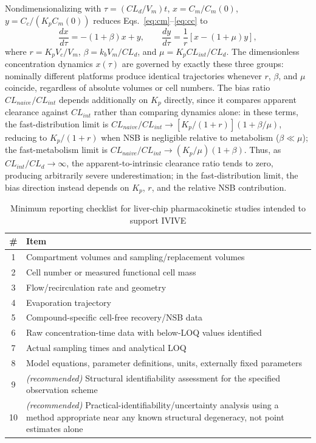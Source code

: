 Nondimensionalizing with $\tau = (CL_d/V_m)t$, $x = C_m/C_m(0)$, $y = C_c/(K_p C_m(0))$ reduces Eqs.~\eqref{eq:cm}--\eqref{eq:cc} to
\begin{equation}
\frac{dx}{d\tau} = -(1+\beta)x + y, \qquad \frac{dy}{d\tau} = \frac{1}{r}\left[x - (1+\mu)y\right], \label{eq:nondim}
\end{equation}
where $r = K_p V_c/V_m$, $\beta = k_b V_m/CL_d$, and $\mu = K_p CL_{int}/CL_d$. The dimensionless concentration dynamics $x(\tau)$ are governed by exactly these three groups: nominally different platforms produce identical trajectories whenever $r$, $\beta$, and $\mu$ coincide, regardless of absolute volumes or cell numbers. The bias ratio $CL_{naive}/CL_{int}$ depends additionally on $K_p$ directly, since it compares apparent clearance against $CL_{int}$ rather than comparing dynamics alone: in these terms, the fast-distribution limit is $CL_{naive}/CL_{int} \to [K_p/(1+r)](1+\beta/\mu)$, reducing to $K_p/(1+r)$ when NSB is negligible relative to metabolism ($\beta\ll\mu$); the fast-metabolism limit is $CL_{naive}/CL_{int} \to (K_p/\mu)(1+\beta)$. Thus, as $CL_{int}/CL_d\to\infty$, the apparent-to-intrinsic clearance ratio tends to zero, producing arbitrarily severe underestimation; in the fast-distribution limit, the bias direction instead depends on $K_p$, $r$, and the relative NSB contribution.

\begin{table}[t]
\centering
\caption{Minimum reporting checklist for liver-chip pharmacokinetic studies intended to support IVIVE}
\label{tab:checklist}
\begin{tabular}{@{}cp{11cm}@{}}
\toprule
\# & Item \\
\midrule
1 & Compartment volumes and sampling/replacement volumes \\
2 & Cell number or measured functional cell mass \\
3 & Flow/recirculation rate and geometry \\
4 & Evaporation trajectory \\
5 & Compound-specific cell-free recovery/NSB data \\
6 & Raw concentration-time data with below-LOQ values identified \\
7 & Actual sampling times and analytical LOQ \\
8 & Model equations, parameter definitions, units, externally fixed parameters \\
\midrule
9 & \textit{(recommended)} Structural identifiability assessment for the specified observation scheme \\
10 & \textit{(recommended)} Practical-identifiability/uncertainty analysis using a method appropriate near any known structural degeneracy, not point estimates alone \\
\bottomrule
\end{tabular}
\end{table}
